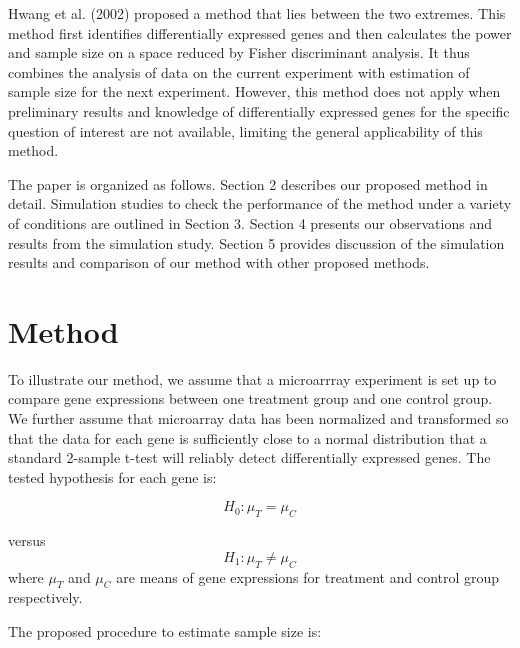 \documentclass{bioinfo}
\begin{document}
Hwang et al. (2002) proposed a method that lies between the two
extremes.  This method first identifies differentially expressed
genes and then calculates the power and sample size on a space
reduced by Fisher discriminant analysis. It thus combines the
analysis of data on the current experiment with estimation of
sample size for the next experiment. However, this method does not
apply when preliminary results and knowledge of differentially
expressed genes for the specific question of interest are not
available, limiting the general applicability of this method.

The paper is organized as follows. Section 2 describes our proposed
method in detail. Simulation studies to check the performance of the
method under a variety of conditions are outlined in Section 3.
Section 4 presents our observations and results from the simulation
study.  Section 5 provides discussion of the simulation results and
comparison of our method with other proposed methods.

\section{Method}
To illustrate our method, we assume that a microarrray experiment
is set up to compare gene expressions between one treatment group
and one control group. We further assume that microarray data has
been normalized and transformed so that the data for each gene is
sufficiently close to a normal distribution that a standard
2-sample t-test will reliably detect differentially expressed
genes. The tested hypothesis for each gene is:

\begin{equation}
  H_0: \mu_{T} = \mu_{C}  \nonumber
\end{equation}

versus
\begin{equation}
  H_1: \mu_{T} \neq \mu_{C} \nonumber
\end{equation}
where $\mu_{T}$ and $\mu_{C}$ are means of gene expressions for treatment and control group respectively.

The proposed procedure to estimate sample size is:
\end{document}
